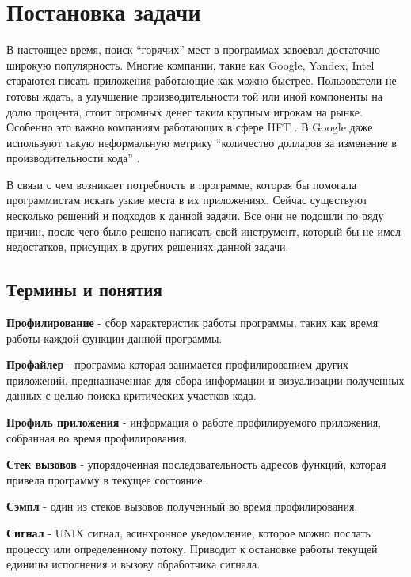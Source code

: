 \chapter{Постановка задачи}

	В настоящее время, поиск \enquote{горячих} мест в программах завоевал достаточно широкую популярность. Многие компании, такие как Google, Yandex, Intel стараются писать приложения работающие как можно быстрее. Пользователи не готовы ждать, а улучшение производительности той или иной компоненты на долю процента, стоит огромных денег таким крупным игрокам на рынке. Особенно это важно компаниям работающих в сфере HFT \cite{hft}. В Google даже используют такую неформальную метрику \enquote{количество долларов за изменение в производительности кода} \cite{gwp}.

	В связи с чем возникает потребность в программе, которая бы помогала программистам искать узкие места в их приложениях. Сейчас существуют несколько решений и подходов к данной задачи. Все они не подошли по ряду причин, после чего было решено написать свой инструмент, который бы не имел недостатков, присущих в других решениях данной задачи.

\section{Термины и понятия}

	\textbf{Профилирование} - сбор характеристик работы программы, таких как время работы каждой функции данной программы. 
    
    \textbf{Профайлер} - программа которая занимается профилированием других приложений, предназначенная для сбора информации и визуализации полученных данных с целью поиска критических участков кода.
    
    \textbf{Профиль приложения} - информация о работе профилируемого приложения, собранная во время профилирования.
    
    \textbf{Стек вызовов} - упорядоченная последовательность адресов функций, которая привела программу в текущее состояние.
    
    \textbf{Сэмпл} - один из стеков вызовов полученный во время профилирования.
    
    \textbf{Сигнал} - UNIX сигнал, асинхронное уведомление, которое можно послать процессу или определенному потоку. Приводит к остановке работы текущей единицы исполнения и вызову обработчика сигнала.  
    
